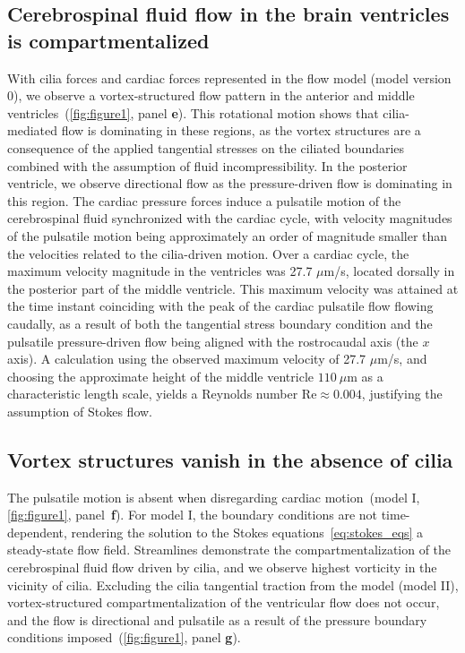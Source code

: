 \documentclass[fleqn]{wlscirep}
\begin{document}
\subsection*{Cerebrospinal fluid flow in the brain ventricles is compartmentalized}
With cilia forces and cardiac forces represented in the flow model (model version 0), we observe a vortex-structured flow pattern in the anterior and middle ventricles~(\cref{fig:figure1}, panel \textbf{e}). This rotational motion shows that cilia-mediated flow is dominating in these regions, as the vortex structures are a consequence of the applied tangential stresses on the ciliated boundaries combined with the assumption of fluid incompressibility. In the posterior ventricle, we observe directional flow as the pressure-driven flow is dominating in this region. The cardiac pressure forces induce a pulsatile motion of the cerebrospinal fluid synchronized with the cardiac cycle, with velocity magnitudes of the pulsatile motion being approximately an order of magnitude smaller than the velocities related to the cilia-driven motion. Over a cardiac cycle, the maximum velocity magnitude in the ventricles was 27.7 $\mu$m/s, located dorsally in the posterior part of the middle ventricle. This maximum velocity was attained at the time instant coinciding with the peak of the cardiac pulsatile flow flowing caudally, as a result of both the tangential stress boundary condition and the pulsatile pressure-driven flow being aligned with the rostrocaudal axis (the $x$ axis). A calculation using the observed maximum velocity of 27.7 $\mu$m/s, and choosing the approximate height of the middle ventricle $110 \ \mu$m as a characteristic length scale, yields a Reynolds number $\mathrm{Re} \approx 0.004$, justifying the assumption of Stokes flow.

\subsection*{Vortex structures vanish in the absence of cilia}
The pulsatile motion is absent when disregarding cardiac motion~(model I, \cref{fig:figure1}, panel~\textbf{f}). For model I, the boundary conditions are not time-dependent, rendering the solution to the Stokes equations~\eqref{eq:stokes_eqs} a steady-state flow field. Streamlines demonstrate the compartmentalization of the cerebrospinal fluid flow driven by cilia, and we observe highest vorticity in the vicinity of cilia. Excluding the cilia tangential traction from the model (model II), vortex-structured compartmentalization of the ventricular flow does not occur, and the flow is directional and pulsatile as a result of the pressure boundary conditions imposed~(\cref{fig:figure1}, panel \textbf{g}). 
\end{document}
